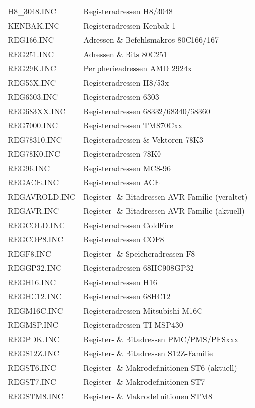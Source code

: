 \documentclass[12pt,a4paper,twoside]{report}
\begin{document}
\begin{center}
\begin{longtable}{|l|l|}
H8\_3048.INC      & Registeradressen H8/3048 \\
KENBAK.INC        & Registeradressen Kenbak-1 \\
REG166.INC        & Adressen \& Befehlsmakros 80C166/167 \\
REG251.INC        & Adressen \& Bits 80C251 \\
REG29K.INC        & Peripherieadressen AMD 2924x \\
REG53X.INC        & Registeradressen H8/53x \\
REG6303.INC       & Registeradressen 6303 \\
REG683XX.INC      & Registeradressen 68332/68340/68360 \\
REG7000.INC       & Registeradressen TMS70Cxx \\
REG78310.INC      & Registeradressen \& Vektoren 78K3 \\
REG78K0.INC       & Registeradressen 78K0 \\
REG96.INC         & Registeradressen MCS-96 \\
REGACE.INC        & Registeradressen ACE \\
REGAVROLD.INC     & Register- \& Bitadressen AVR-Familie (veraltet)\\
REGAVR.INC        & Register- \& Bitadressen AVR-Familie (aktuell)\\
REGCOLD.INC       & Registeradressen ColdFire \\
REGCOP8.INC       & Registeradressen COP8 \\
REGF8.INC         & Register- \& Speicheradressen F8 \\
REGGP32.INC       & Registeradressen 68HC908GP32 \\
REGH16.INC        & Registeradressen H16 \\
REGHC12.INC       & Registeradressen 68HC12 \\
REGM16C.INC       & Registeradressen Mitsubishi M16C \\
REGMSP.INC        & Registeradressen TI MSP430 \\
REGPDK.INC        & Register- \& Bitadressen PMC/PMS/PFSxxx \\
REGS12Z.INC       & Register- \& Bitadressen S12Z-Familie \\
REGST6.INC        & Register- \& Makrodefinitionen ST6 (aktuell)\\
REGST7.INC        & Register- \& Makrodefinitionen ST7 \\
REGSTM8.INC       & Register- \& Makrodefinitionen STM8 \\

\end{longtable}
\end{center}
\end{document}
